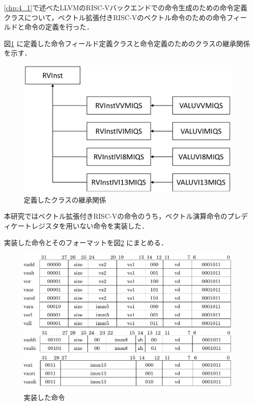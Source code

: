 
\ref{chp:4_1}で述べたLLVMのRISC-Vバックエンドでの命令生成のための命令定義クラスについて，ベクトル拡張付きRISC-Vのベクトル命令のための命令フィールドと命令の定義を行った．

図\ref{fig:MIQSInst_class}
に定義した命令フィールド定義クラスと命令定義のためのクラスの継承関係を示す．

\begin{figure}[tb]
    \centering
    \includegraphics[scale=0.6]{image/MIQSInst_class.pdf}
    \caption{定義したクラスの継承関係}
    \label{fig:MIQSInst_class}
\end{figure}

本研究ではベクトル拡張付きRISC-Vの命令のうち，ベクトル演算命令のプレディケートレジスタを用いない命令を実装した．

実装した命令とそのフォーマットを図\ref{fig:jissou_inst_format}
にまとめる．

\begin{figure}[tb]
    \centering
    \includegraphics[scale=0.8]{image/jissou_inst_format.pdf}
    \caption{実装した命令}
    \label{fig:jissou_inst_format}
\end{figure}


